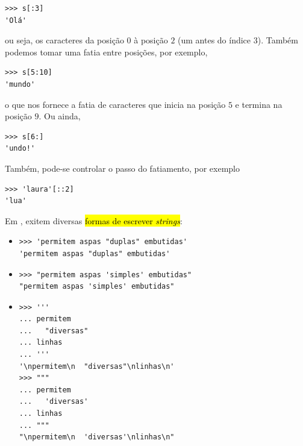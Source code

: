 \begin{lstlisting}
>>> s[:3]
'Olá'
\end{lstlisting}

ou seja, os caracteres da posição $0$ à posição $2$ (um antes do índice $3$). Também podemos tomar uma fatia entre posições, por exemplo,

\begin{lstlisting}
>>> s[5:10]
'mundo'
\end{lstlisting}

o que nos fornece a fatia de caracteres que inicia na posição $5$ e termina na posição $9$. Ou ainda,

\begin{lstlisting}
>>> s[6:]
'undo!'
\end{lstlisting}

Também, pode-se controlar o passo do fatiamento, por exemplo

\begin{lstlisting}
>>> 'laura'[::2]
'lua'
\end{lstlisting}

Em {\python}, exitem diversas \hl{formas de escrever \textit{strings}}:
\begin{itemize}
\item {}

\begin{lstlisting}[framexrightmargin=-2.5em]
>>> 'permitem aspas "duplas" embutidas'
'permitem aspas "duplas" embutidas'
\end{lstlisting}

\item {}

\begin{lstlisting}[framexrightmargin=-2.5em]
>>> "permitem aspas 'simples' embutidas"
"permitem aspas 'simples' embutidas"
\end{lstlisting}

\item {}

\begin{lstlisting}[framexrightmargin=-2.5em]
>>> '''
... permitem
...   "diversas"
... linhas
... '''
'\npermitem\n  "diversas"\nlinhas\n'
>>> """
... permitem
...   'diversas'
... linhas
... """
"\npermitem\n  'diversas'\nlinhas\n"
\end{lstlisting}
\end{itemize}

